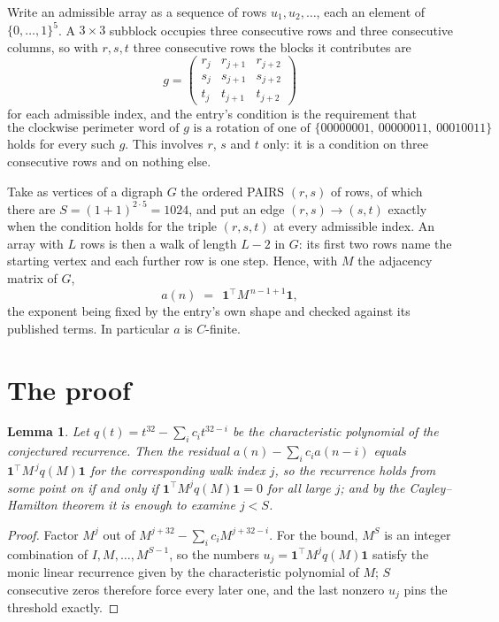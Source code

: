 \documentclass[11pt,a4paper]{article}
\theoremstyle{plain}
\newtheorem{lemma}[theorem]{Lemma}
\theoremstyle{definition}
\begin{document}
Write an admissible array as a sequence of rows $u_1,u_2,\dots$, each an element of
$\{0,\dots,1\}^{5}$. A $3\times3$ subblock occupies three consecutive rows and
three consecutive columns, so with $r,s,t$ three consecutive rows the blocks it
contributes are
\[
g=\begin{pmatrix}r_j&r_{j+1}&r_{j+2}\\ s_j&s_{j+1}&s_{j+2}\\ t_j&t_{j+1}&t_{j+2}\end{pmatrix}
\]
for each admissible index, and the entry's condition is the requirement that
\[
\text{the clockwise perimeter word of }g\text{ is a rotation of one of }\{00000001,\ 00000011,\ 00010011\}
\]
holds for every such $g$. This involves $r$, $s$ and $t$ only: it is a condition on
three consecutive rows and on nothing else.

Take as vertices of a digraph $G$ the ordered PAIRS $(r,s)$ of rows, of which there are
$S=(1+1)^{2\cdot5}=1024$, and put an edge $(r,s)\to(s,t)$ exactly when the condition
holds for the triple $(r,s,t)$ at every admissible index. An array with $L$ rows is then a
walk of length $L-2$ in $G$: its first two rows name the starting vertex and each further
row is one step. Hence, with $M$ the adjacency matrix of $G$,
\[
a(n)\;=\;\,\mathbf{1}^{\!\top}M^{\,n-1+1}\mathbf{1},
\]
the exponent being fixed by the entry's own shape and checked against its published terms.
In particular $a$ is $C$-finite.

\section{The proof}

\begin{lemma}\label{lem:crit}
Let $q(t)=t^{32}-\sum_i c_it^{32-i}$ be the characteristic polynomial of the
conjectured recurrence. Then the residual $a(n)-\sum_ic_ia(n-i)$ equals
$\mathbf{1}^{\!\top}M^{\,j}q(M)\mathbf{1}$ for the corresponding walk index
$j$, so the recurrence holds from some point on if and only if
$\mathbf{1}^{\!\top}M^{j}q(M)\mathbf{1}=0$ for all large $j$; and by the
Cayley--Hamilton theorem it is enough to examine $j<S$.
\end{lemma}

\begin{proof}
Factor $M^{j}$ out of $M^{j+32}-\sum_ic_iM^{j+32-i}$. For the bound, $M^{S}$
is an integer combination of $I,M,\dots,M^{S-1}$, so the numbers
$u_j=\mathbf{1}^{\!\top}M^{j}q(M)\mathbf{1}$ satisfy the monic linear recurrence given by
the characteristic polynomial of $M$; $S$ consecutive zeros therefore force every later one,
and the last nonzero $u_j$ pins the threshold exactly.
\end{proof}
\end{document}
